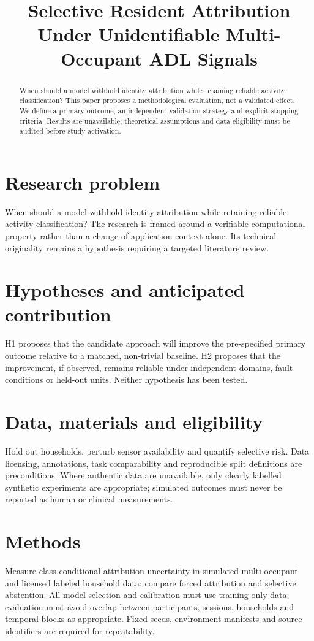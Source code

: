 \documentclass[11pt,a4paper]{article}
\title{Selective Resident Attribution Under Unidentifiable Multi-Occupant ADL Signals}
\author{}
\date{}
\begin{document}
\maketitle
\begin{abstract}
When should a model withhold identity attribution while retaining reliable activity classification? This paper proposes a methodological evaluation, not a validated effect. We define a primary outcome, an independent validation strategy and explicit stopping criteria. Results are unavailable; theoretical assumptions and data eligibility must be audited before study activation.
\end{abstract}
\section{Research problem}
When should a model withhold identity attribution while retaining reliable activity classification? The research is framed around a verifiable computational property rather than a change of application context alone. Its technical originality remains a hypothesis requiring a targeted literature review.
\section{Hypotheses and anticipated contribution}
H1 proposes that the candidate approach will improve the pre-specified primary outcome relative to a matched, non-trivial baseline. H2 proposes that the improvement, if observed, remains reliable under independent domains, fault conditions or held-out units. Neither hypothesis has been tested.
\section{Data, materials and eligibility}
Hold out households, perturb sensor availability and quantify selective risk. Data licensing, annotations, task comparability and reproducible split definitions are preconditions. Where authentic data are unavailable, only clearly labelled synthetic experiments are appropriate; simulated outcomes must never be reported as human or clinical measurements.
\section{Methods}
Measure class-conditional attribution uncertainty in simulated multi-occupant and licensed labeled household data; compare forced attribution and selective abstention. All model selection and calibration must use training-only data; evaluation must avoid overlap between participants, sessions, households and temporal blocks as appropriate. Fixed seeds, environment manifests and source identifiers are required for repeatability.
\end{document}
